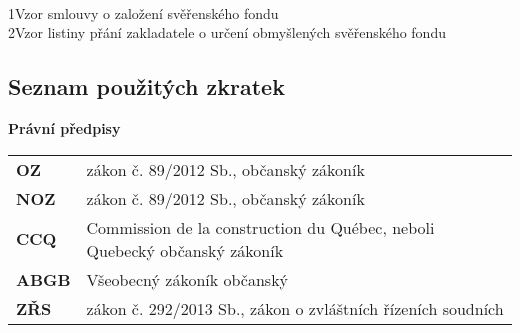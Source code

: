 \documentclass{article}
\begin{document}

\newpage
  \thispagestyle{Contents}
  \tableofcontents
  
 \newpage
  \listoffigures


\vspace*{0.5cm}
  
\\

\normalsize{1\hspace*{1.8em}Vzor smlouvy o založení svěřenského fondu}\\
\indent\normalsize{2\hspace*{1.8em}Vzor listiny přání zakladatele o určení obmyšlených svěřenského fondu}


\newpage
 
\begin{center}
\section{Seznam použitých zkratek}
\end{center}

\vspace{5 mm}

\textbf{Právní předpisy}

\vspace{5 mm}

\begin{tabular}{p{3cm}p{8cm}}
\textbf{OZ} & zákon č. 89/2012 Sb., občanský zákoník	 \\
\textbf{NOZ} & zákon č. 89/2012 Sb., občanský zákoník	 \\
\textbf{CCQ} & Commission de la construction du Québec, neboli Quebecký občanský zákoník \\
\textbf{ABGB} & Všeobecný zákoník občanský	 \\
\textbf{ZŘS} & zákon č. 292/2013 Sb., zákon o zvláštních řízeních soudních	 \\
\end{tabular}
\end{document}
